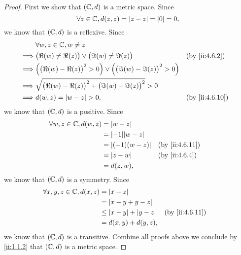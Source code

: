 \begin{proof}
  First we show that \((\mathbb{C}, d)\) is a metric space.
  Since
  \[
    \forall z \in \mathbb{C}, d(z, z) = \left\lvert z - z\right\rvert = \left\lvert0\right\rvert = 0,
  \]
  we know that \((\mathbb{C}, d)\) is a reflexive.
  Since
  \begin{align*}
             & \forall w, z \in \C, w \neq z                                                                                \\
    \implies & \big(\Re(w) \neq \Re(z)\big) \lor \big(\Im(w) \neq \Im(z)\big)                           &  & \by{ii:4.6.2}  \\
    \implies & \Big(\big(\Re(w) - \Re(z)\big)^2 > 0\Big) \lor \Big(\big(\Im(w) - \Im(z)\big)^2 > 0\Big)                     \\
    \implies & \sqrt{\big(\Re(w) - \Re(z)\big)^2 + \big(\Im(w) - \Im(z)\big)^2} > 0                                         \\
    \implies & d(w, z) = \abs{w - z} > 0,                                                               &  & \by{ii:4.6.10}
  \end{align*}
  we know that \((\mathbb{C}, d)\) is a positive.
  Since
  \begin{align*}
    \forall w, z \in \C, d(w, z) & = \abs{w - z}                              \\
                                 & = \abs{-1} \abs{w - z}                     \\
                                 & = \abs{(-1) (w - z)}   &  & \by{ii:4.6.11} \\
                                 & = \abs{z - w}          &  & \by{ii:4.6.4}  \\
                                 & = d(z, w),
  \end{align*}
  we know that \((\mathbb{C}, d)\) is a symmetry.
  Since
  \begin{align*}
    \forall x, y, z \in \C, d(x, z) & = \abs{x - z}                                      \\
                                    & = \abs{x - y + y - z}                              \\
                                    & \leq \abs{x - y} + \abs{y - z} &  & \by{ii:4.6.11} \\
                                    & = d(x, y) + d(y, z),
  \end{align*}
  we know that \((\mathbb{C}, d)\) is a transitive.
  Combine all proofs above we conclude by \cref{ii:1.1.2} that \((\mathbb{C}, d)\) is a metric space.


\end{proof}
